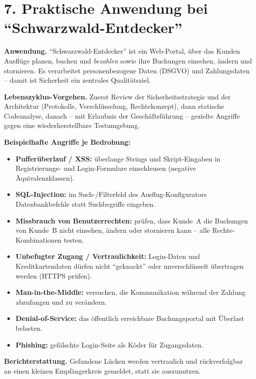 \documentclass[
	fontsize=12pt,          %
	paper=a4,               %
	numbers=noenddot,       %
	listof=totoc,           %
	listof=entryprefix,     %
	listof=nochaptergap,    %
	bibliography=totoc,     %
	parskip=half,           %
	openany                 %
]{scrbook}
\begin{document}
\section*{7. Praktische Anwendung bei ``Schwarzwald-Entdecker''}

\textbf{Anwendung.} ``Schwarzwald-Entdecker'' ist ein Web-Portal, über das Kunden
Ausflüge planen, buchen und \emph{bezahlen} sowie ihre Buchungen einsehen, ändern
und stornieren.
Es verarbeitet personenbezogene Daten (DSGVO) und Zahlungsdaten -- damit ist
Sicherheit ein zentrales Qualitätsziel.

\textbf{Lebenszyklus-Vorgehen.} Zuerst Review der Sicherheitsstrategie und der
Architektur (Protokolle, Verschlüsselung, Rechtekonzept), dann statische
Codeanalyse, danach -- mit Erlaubnis der Geschäftsführung -- gezielte Angriffe
gegen eine wiederherstellbare Testumgebung.

\textbf{Beispielhafte Angriffe je Bedrohung:}

\begin{itemize}
	\item \textbf{Pufferüberlauf / XSS:} überlange Strings und Skript-Eingaben in
	      Registrierungs- und Login-Formulare einschleusen (negative
	      Äquivalenzklassen).
	\item \textbf{SQL-Injection:} im Such-/Filterfeld des Ausflug-Konfigurators
	      Datenbankbefehle statt Suchbegriffe eingeben.
	\item \textbf{Missbrauch von Benutzerrechten:} prüfen, dass Kunde~A die
	      Buchungen von Kunde~B nicht einsehen, ändern oder stornieren kann --
	      alle Rechte-Kombinationen testen.
	\item \textbf{Unbefugter Zugang / Vertraulichkeit:} Login-Daten und
	      Kreditkartendaten dürfen nicht ``geknackt'' oder unverschlüsselt
	      übertragen werden (HTTPS prüfen).
	\item \textbf{Man-in-the-Middle:} versuchen, die Kommunikation während der
	      Zahlung abzufangen und zu verändern.
	\item \textbf{Denial-of-Service:} das öffentlich erreichbare Buchungsportal
	      mit Überlast belasten.
	\item \textbf{Phishing:} gefälschte Login-Seite als Köder für Zugangsdaten.
\end{itemize}

\textbf{Berichterstattung.} Gefundene Lücken werden vertraulich und
rückverfolgbar an einen kleinen Empfängerkreis gemeldet, statt sie auszunutzen.
\end{document}
